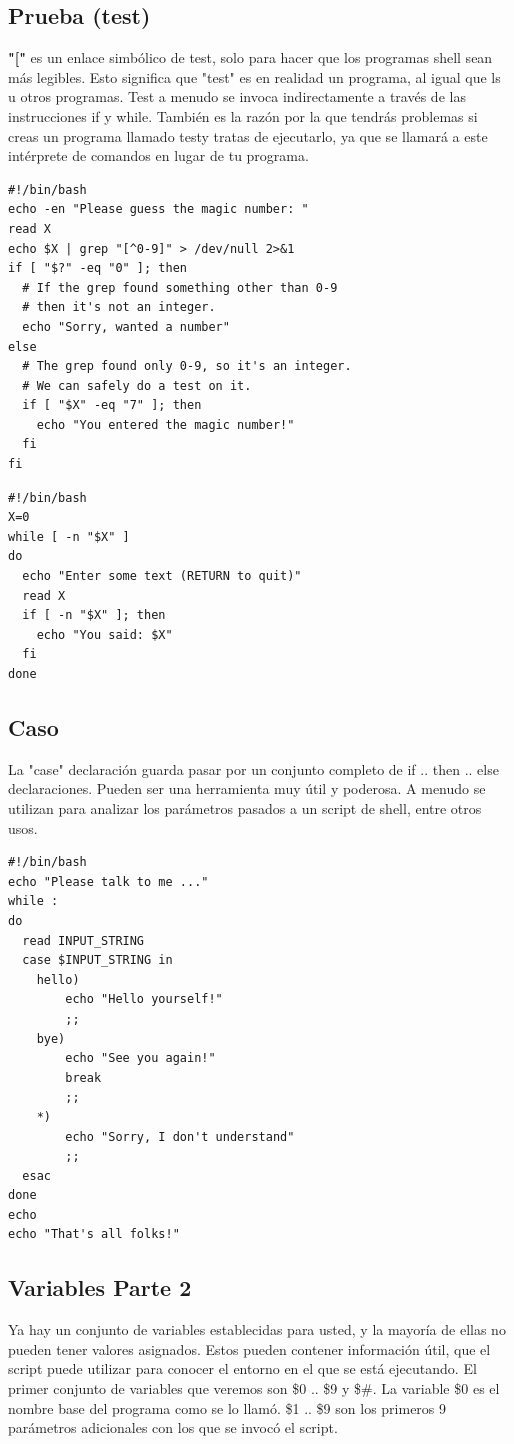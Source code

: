 \documentclass{article}
\begin{document}
\subsection{Prueba (test)}
\textbf{"["} es un enlace simbólico de test, solo para hacer que los programas shell sean más legibles. Esto significa que "test" es en realidad un programa, al igual que ls u otros programas. 
Test a menudo se invoca indirectamente a través de las instrucciones if y while. También es la razón por la que tendrás problemas si creas un programa llamado testy tratas de ejecutarlo, ya que se llamará a este intérprete de comandos en lugar de tu programa.
\begin{verbatim}
#!/bin/bash
echo -en "Please guess the magic number: "
read X
echo $X | grep "[^0-9]" > /dev/null 2>&1
if [ "$?" -eq "0" ]; then
  # If the grep found something other than 0-9
  # then it's not an integer.
  echo "Sorry, wanted a number"
else
  # The grep found only 0-9, so it's an integer.
  # We can safely do a test on it.
  if [ "$X" -eq "7" ]; then
    echo "You entered the magic number!"
  fi
fi
\end{verbatim}

\begin{verbatim}
#!/bin/bash
X=0
while [ -n "$X" ]
do
  echo "Enter some text (RETURN to quit)"
  read X
  if [ -n "$X" ]; then
    echo "You said: $X"
  fi
done
\end{verbatim}

\subsection{Caso}
La "case" declaración guarda pasar por un conjunto completo de if .. then .. else declaraciones. Pueden ser una herramienta muy útil y poderosa. A menudo se utilizan para analizar los parámetros pasados a un script de shell, entre otros usos.
\begin{verbatim}
#!/bin/bash
echo "Please talk to me ..."
while :
do
  read INPUT_STRING
  case $INPUT_STRING in
	hello)
		echo "Hello yourself!"
		;;
	bye)
		echo "See you again!"
		break
		;;
	*)
		echo "Sorry, I don't understand"
		;;
  esac
done
echo
echo "That's all folks!"
\end{verbatim}

\subsection{Variables Parte 2}
Ya hay un conjunto de variables establecidas para usted, y la mayoría de ellas no pueden tener valores asignados. 
Estos pueden contener información útil, que el script puede utilizar para conocer el entorno en el que se está ejecutando. 
El primer conjunto de variables que veremos son \$0 .. \$9 y \$\#. 
La variable \$0 es el nombre base del programa como se lo llamó. 
\$1 .. \$9 son los primeros 9 parámetros adicionales con los que se invocó el script. 
\end{document}
